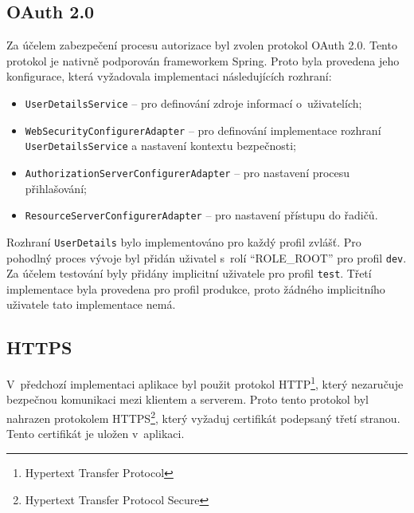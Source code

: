     \subsection{OAuth 2.0}
        Za účelem zabezpečení procesu autorizace byl zvolen protokol OAuth 2.0. Tento protokol je nativně podporován frameworkem Spring. Proto byla provedena jeho konfigurace, která vyžadovala implementaci následujících rozhraní:
        \begin{itemize}
            \setlength\itemsep{0.3em}
            \item \texttt{UserDetailsService} -- pro definování zdroje informací o~uživatelích;
            \item \texttt{WebSecurityConfigurerAdapter} -- pro definování implementace rozhraní \texttt{UserDetailsService} a nastavení kontextu bezpečnosti;
            \item \texttt{AuthorizationServerConfigurerAdapter} -- pro nastavení procesu přihlašování;
            \item \texttt{ResourceServerConfigurerAdapter} -- pro nastavení přístupu do řadičů.
        \end{itemize}
        
        Rozhraní \verb|UserDetails| bylo implementováno pro každý profil zvlášť. Pro pohodlný proces vývoje byl přidán uživatel s~rolí \enquote{ROLE\_ROOT} pro profil \verb|dev|. Za účelem testování byly přidány implicitní uživatele pro profil \verb|test|. Třetí implementace byla provedena pro profil produkce, proto žádného implicitního uživatele tato implementace nemá.
        
    \subsection{HTTPS}
        V~předchozí implementaci aplikace byl použit protokol HTTP\footnote{Hypertext Transfer Protocol}, který nezaručuje bezpečnou komunikaci mezi klientem a serverem. Proto tento protokol byl nahrazen protokolem HTTPS\footnote{Hypertext Transfer Protocol Secure}, který vyžaduj certifikát podepsaný třetí stranou. Tento certifikát je uložen v~aplikaci.
        
